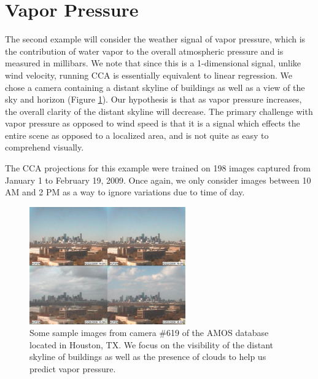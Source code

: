 \section{Vapor Pressure}
The second example will consider the weather signal of vapor pressure, which is the contribution of water vapor to the overall atmospheric pressure and is measured in millibars. We note that since this is a 1-dimensional signal, unlike wind velocity, running CCA is essentially equivalent to linear regression. We chose a camera containing a distant skyline of buildings as well as a view of the sky and horizon (Figure \ref{fig:vaporextremes}). Our hypothesis is that as vapor pressure increases, the overall clarity of the distant skyline will decrease. The primary challenge with vapor pressure as opposed to wind speed is that it is a signal which effects the entire scene as opposed to a localized area, and is not quite as easy to comprehend visually.

The CCA projections for this example were trained on 198 images captured from January 1 to February 19, 2009. Once again, we only consider images between 10 AM and 2 PM as a way to ignore variations due to time of day.
\begin{figure}
	\centering
		\includegraphics[width=0.60\textwidth]{figures/vaporextremes.jpg}
	\caption{Some sample images from camera $\#$619 of the AMOS database located in Houston, TX. We focus on the visibility of the distant skyline of buildings as well as the presence of clouds to help us predict vapor pressure.}
	\label{fig:vaporextremes}
\end{figure}

